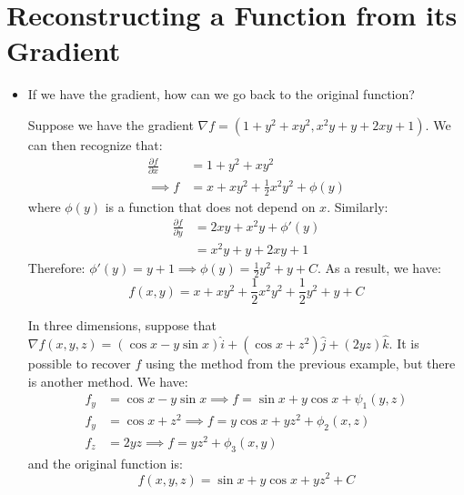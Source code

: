 \section{Reconstructing a Function from its Gradient}
\begin{itemize}
    \item If we have the gradient, how can we go back to the original function?
    \begin{example}
        Suppose we have the gradient $\nabla f = (1+y^2+xy^2, x^2y+y+2xy+1)$. We can then recognize that:
        \begin{align}
            \frac{\partial f}{\partial x} &= 1 + y^2 + xy^2 \\ 
            \implies f &= x+xy^2+\frac{1}{2}x^2y^2 + \phi(y)
        \end{align}
        where $\phi(y)$ is a function that does not depend on $x$. Similarly:
        \begin{align}
            \frac{\partial f}{\partial y} &= 2xy + x^2y + \phi'(y) \\ 
            &= x^2y + y + 2xy + 1
        \end{align}
        Therefore: $\phi'(y) = y+1 \implies \phi(y) = \frac{1}{2}y^2 + y + C$. As a result, we have:
        \begin{equation}
            f(x,y) = x+ xy^2 + \frac{1}{2}x^2y^2 + \frac{1}{2}y^2 + y + C
        \end{equation}
    \end{example}
    \begin{example}
        In three dimensions, suppose that $\nabla f(x,y,z) = (\cos x - y\sin x)\hat{i} + (\cos x + z^2)\hat{j} + (2yz)\hat{k}$. It is possible to recover $f$ using the method from the previous example, but there is another method. We have:
        \begin{align}
            f_y &= \cos x - y\sin x \implies f = \sin x + y\cos x + \psi_1(y,z) \\ 
            f_y &= \cos x + z^2 \implies f = y\cos x+ yz^2 + \phi_2(x,z) \\ 
            f_z &= 2yz \implies f=yz^2 + \phi_3(x,y)
        \end{align}
        and the original function is:
        \begin{equation}
            f(x,y,z) = \sin x + y\cos x + yz^2 + C
        \end{equation}
    \end{example}
    \begin{example}

\end{example}
\end{itemize}
